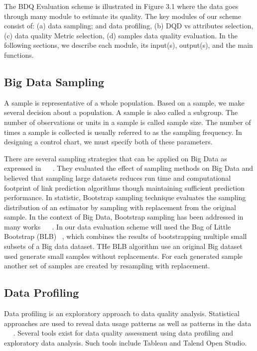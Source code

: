 The BDQ Evaluation scheme is illustrated in Figure 3.1 where the data goes through many module to estimate its quality.
The key modules of our scheme consist of: (a) data sampling; and data profiling, (b) DQD vs attributes selection, 
(c) data quality Metric selection, (d) samples data quality evaluation. In the following sections, we describe each module, its input(s), output(s),
and the main functions.

\subsection{Big Data Sampling}

A sample is representative of a whole population. Based on a sample, we make several decision about a population. 
A sample is also called a subgroup. The number of observations or units in a sample is called sample size. 
The number of times a sample is collected is usually referred to as the sampling frequency. In designing a control chart, we must 
specify both of these parameters. ~\cite{Jugulum14}

There are several sampling strategies that can be applied on Big Data as expressed in ~\cite{Asilomar} ~\cite{SIGKDD}.
They evaluated the effect of sampling methods on Big Data and believed that sampling large datasets reduces run time and computational footprint of link 
prediction algorithms though maintaining sufficient prediction performance. In statistic, Bootstrap sampling technique evaluates the sampling distribution of an 
estimator by sampling with replacement from the original sample. In the context of Big Data, Bootstrap sampling has been addressed in many works 
~\cite{Liang2016} ~\cite{Satyanarayana2014}. 
In our data evaluation scheme will used the Bag of Little Bootstrap (BLB) ~\cite{ArXiv12066415}, which combines the results of bootstrapping multiple small subsets of a 
Big data dataset. THe BLB algorithm use an original Big dataset used generate small samples without replacements. 
For each generated sample another set of samples are created by resampling with replacement.

\subsection{Data Profiling}

Data profiling is an exploratory approach to data quality analysis. Statistical approaches are used to reveal 
data usage patterns as well as patterns in the data ~\cite{Osborne2013} ~\cite{Maydanchik2007}. Several tools exist for data quality assessment using data profiling 
and exploratory data analysis. Such tools include Tableau and Talend Open Studio. 

